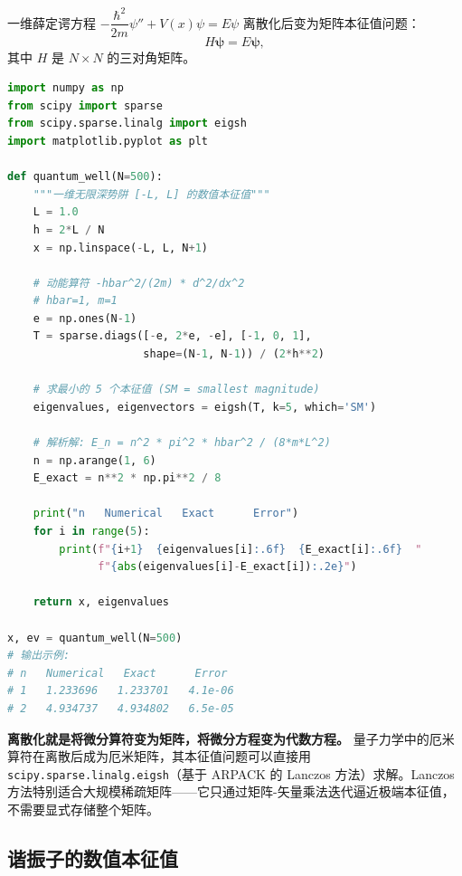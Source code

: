 一维薛定谔方程 $-\dfrac{\hbar^2}{2m}\psi'' + V(x)\psi = E\psi$ 离散化后变为矩阵本征值问题：
\begin{equation}
H\mathbf{\psi} = E\mathbf{\psi},
\end{equation}
其中 $H$ 是 $N\times N$ 的三对角矩阵。

\begin{lstlisting}[language=Python, caption=一维无限深势阱的数值本征值]
import numpy as np
from scipy import sparse
from scipy.sparse.linalg import eigsh
import matplotlib.pyplot as plt

def quantum_well(N=500):
    """一维无限深势阱 [-L, L] 的数值本征值"""
    L = 1.0
    h = 2*L / N
    x = np.linspace(-L, L, N+1)

    # 动能算符 -hbar^2/(2m) * d^2/dx^2
    # hbar=1, m=1
    e = np.ones(N-1)
    T = sparse.diags([-e, 2*e, -e], [-1, 0, 1],
                     shape=(N-1, N-1)) / (2*h**2)

    # 求最小的 5 个本征值 (SM = smallest magnitude)
    eigenvalues, eigenvectors = eigsh(T, k=5, which='SM')

    # 解析解: E_n = n^2 * pi^2 * hbar^2 / (8*m*L^2)
    n = np.arange(1, 6)
    E_exact = n**2 * np.pi**2 / 8

    print("n   Numerical   Exact      Error")
    for i in range(5):
        print(f"{i+1}  {eigenvalues[i]:.6f}  {E_exact[i]:.6f}  "
              f"{abs(eigenvalues[i]-E_exact[i]):.2e}")

    return x, eigenvalues

x, ev = quantum_well(N=500)
# 输出示例:
# n   Numerical   Exact      Error
# 1   1.233696   1.233701   4.1e-06
# 2   4.934737   4.934802   6.5e-05
\end{lstlisting}

\begin{insight}
\textbf{离散化就是将微分算符变为矩阵，将微分方程变为代数方程。} 量子力学中的厄米算符在离散后成为厄米矩阵，其本征值问题可以直接用 \texttt{scipy.sparse.linalg.eigsh}（基于 ARPACK 的 Lanczos 方法）求解。Lanczos 方法特别适合大规模稀疏矩阵——它只通过矩阵-矢量乘法迭代逼近极端本征值，不需要显式存储整个矩阵。
\end{insight}

\subsection{谐振子的数值本征值}

